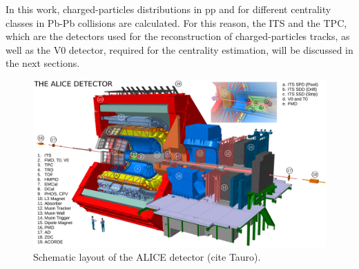 \documentclass[12pt,a4paper]{report}
\begin{document}
In this work, charged-particles \pt distributions in pp and for different centrality classes in Pb-Pb collisions are calculated. For this reason, the ITS and the TPC, which are the detectors used for the reconstruction of charged-particles tracks, as well as the V0 detector, required for the centrality estimation, will be discussed in the next sections. 
\begin{figure}[tb!]
\centering
\includegraphics[width=15cm]{Plots/Alice.png}  
\caption{Schematic layout of the ALICE detector (cite Tauro).}
\label{ALICE}
\end{figure}
\end{document}
